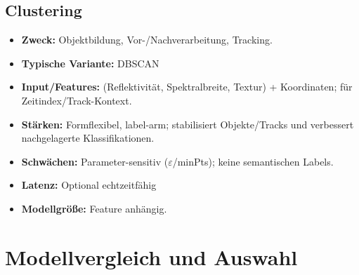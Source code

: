 \subsection*{Clustering}
\begin{itemize}
  \item \textbf{Zweck:} Objektbildung, Vor-/Nachverarbeitung, Tracking.
  \item \textbf{Typische Variante:} DBSCAN
  \item \textbf{Input/Features:} (Reflektivität, Spektralbreite, Textur) + Koordinaten; für Zeitindex/Track-Kontext.
  \item \textbf{Stärken:} Formflexibel, label-arm; stabilisiert Objekte/Tracks und verbessert nachgelagerte Klassifikationen.
  \item \textbf{Schwächen:} Parameter-sensitiv ($\varepsilon$/minPts); keine semantischen Labels.
  \item \textbf{Latenz:} Optional echtzeitfähig
  \item \textbf{Modellgröße:} Feature anhängig.
\end{itemize}

\section{Modellvergleich und Auswahl}

